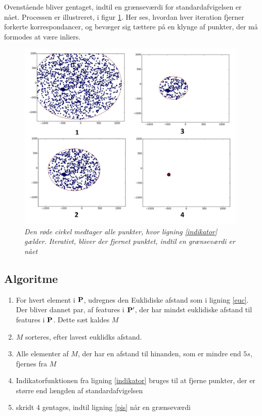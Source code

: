 Ovenstående bliver gentaget, indtil en grænseværdi for standardafvigelsen er nået. Processen er illustreret, i figur \ref{fig:tilmatching}. Her ses, hvordan hver iteration fjerner forkerte korrespondancer, og bevæger sig tættere på en klynge af punkter, der må formodes at være inliers.


\begin{figure}[H]
    \centering
    \includegraphics[width=0.99\textwidth]{fig/tilmatching.jpg}
     \vspace{-0.5em}
    \begin{center}    
       \caption{{\footnotesize \textit{Den røde cirkel medtager alle punkter, hvor ligning \eqref{indikator} gælder. Iterativt, bliver der fjernet punktet, indtil en grænseværdi er nået}}}
    \label{fig:tilmatching}
     \end{center}
     \vspace{-2.5em}
  \end{figure} \noindent

\subsection*{Algoritme}
\begin{enumerate}
\item{For hvert element i $\bold{P}$, udregnes den Euklidiske afstand som i ligning \eqref{euc}. Der bliver dannet par, af features i $\bold{P}'$, der har mindst euklidiske afstand til features i $\bold{P}$. Dette sæt kaldes $M$}
\item{$M$ sorteres, efter lavest euklidks afstand.}
\item{Alle elementer af $M$, der har en afstand til hinanden, som er mindre end $5s$, fjernes fra $M$}
\item{Indikatorfunktionen fra ligning \eqref{indikator} bruges til at fjerne punkter, der er større end længden af standardafvigelsen}
\item{skridt 4 gentages, indtil ligning \eqref{pis} når en grænseværdi}
\end{enumerate}